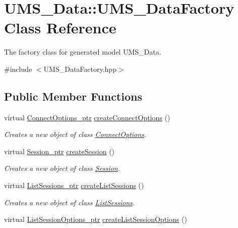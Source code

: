 \hypertarget{classUMS__Data_1_1UMS__DataFactory}{
\section{UMS\_\-Data::UMS\_\-DataFactory Class Reference}
\label{classUMS__Data_1_1UMS__DataFactory}
}


The factory class for generated model UMS\_\-Data.  




{\ttfamily \#include $<$UMS\_\-DataFactory.hpp$>$}

\subsection*{Public Member Functions}
\begin{DoxyCompactItemize}
\item 
virtual \hyperlink{classUMS__Data_1_1ConnectOptions}{ConnectOptions\_\-ptr} \hyperlink{classUMS__Data_1_1UMS__DataFactory_ac23d022d06bb1f25a2085e7783608430}{createConnectOptions} ()
\begin{DoxyCompactList}\small\item\em Creates a new object of class \hyperlink{classUMS__Data_1_1ConnectOptions}{ConnectOptions}. \item\end{DoxyCompactList}\item 
virtual \hyperlink{classUMS__Data_1_1Session}{Session\_\-ptr} \hyperlink{classUMS__Data_1_1UMS__DataFactory_a43d601d0c56c14207e7b70ef4f90bebc}{createSession} ()
\begin{DoxyCompactList}\small\item\em Creates a new object of class \hyperlink{classUMS__Data_1_1Session}{Session}. \item\end{DoxyCompactList}\item 
virtual \hyperlink{classUMS__Data_1_1ListSessions}{ListSessions\_\-ptr} \hyperlink{classUMS__Data_1_1UMS__DataFactory_aa2151876c02e97e80bc1a749d37d397c}{createListSessions} ()
\begin{DoxyCompactList}\small\item\em Creates a new object of class \hyperlink{classUMS__Data_1_1ListSessions}{ListSessions}. \item\end{DoxyCompactList}\item 
virtual \hyperlink{classUMS__Data_1_1ListSessionOptions}{ListSessionOptions\_\-ptr} \hyperlink{classUMS__Data_1_1UMS__DataFactory_a24641366e76d305b29e7f0f359632530}{createListSessionOptions} ()

\end{DoxyCompactItemize}
